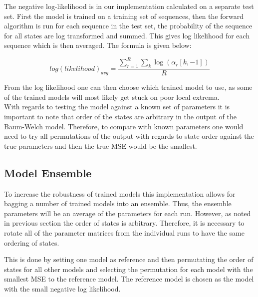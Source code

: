 The negative log-likelihood is in our implementation calculated on a separate test set. First the model is trained on a training set of sequences, then the forward algorithm is run for each sequence in the test set, the probability of the sequence for all states are log transformed and summed. This gives log likelihood for each sequence which is then averaged. The formula is given below:

\begin{equation}
    log(likelihood)_{avg} = \frac{\sum_{r=1}^R \sum_k\log(\alpha_r[k,-1]) }{R}
\end{equation}

From the log likelihood one can then choose which trained model to use, as some of the trained models will most likely get stuck on poor local extrema. \\

\noindent
With regards to testing the model against a known set of parameters it is important to note that order of the states are arbitrary in the output of the Baum-Welch model. Therefore, to compare with known parameters one would need to try all permutations of the output with regards to state order against the true parameters and then the true MSE would be the smallest.

\subsection{Model Ensemble}

To increase the robustness of trained models this implementation allows for bagging a number of trained models into an ensemble. Thus, the ensemble parameters will be an average of the parameters for each run. However, as noted in previous section the order of states is arbitrary. Therefore, it is necessary to rotate all of the parameter matrices from the individual runs to have the same ordering of states.

This is done by setting one model as reference and then permutating the order of states for all other models and selecting the permutation for each model with the smallest MSE to the reference model. The reference model is chosen as the model with the small negative log likelihood. 









